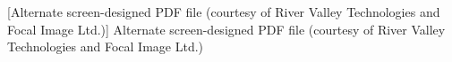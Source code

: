 [Alternate screen-designed PDF file (courtesy of River Valley Technologies and Focal Image Ltd.)]{%
 Alternate screen-designed PDF file (courtesy of River Valley Technologies and Focal Image Ltd.)
}%
